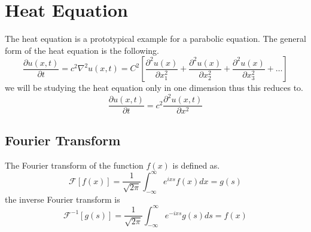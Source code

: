 \documentclass[]{article}
\begin{document}
\section{Heat Equation}
The heat equation is a prototypical example for a parabolic equation. The general form of the heat equation is the following.
\[
    \frac{\partial u(x,t)}{\partial t} = c^2\nabla^2 u(x,t) = C^2\left[\frac{\partial^2 u(x)}{\partial x^{2}_{1}} + \frac{\partial^2 u(x)}{\partial x^{2}_{2}} + \frac{\partial^2 u(x)}{\partial x^{2}_{3}} + \dots\right]    
\]
we will be studying the heat equation only in one dimension thus this reduces to.
\[
    \frac{\partial u(x,t)}{\partial t} = c^2 \frac{\partial^2 u(x,t)}{\partial x^2}     
\]


\subsection{Fourier Transform}

The Fourier transform of the function $f(x)$ is defined as.
\[
    \mathscr{F}\left[f\left(x\right)\right]=\frac{1}{\sqrt{2\pi}}\int_{-\infty}^{\infty}e^{ixs}f\left(x\right)dx= g\left(s\right)    
\] 
the inverse Fourier transform is 
\[
    \mathscr{F}^{-1}\left[g\left(s\right)\right]=\frac{1}{\sqrt{2\pi}}\int_{-\infty}^{\infty}e^{-ixs}g\left(s\right)ds= f\left(x\right)    
\]
\setcounter{equation}{0}
\end{document}
